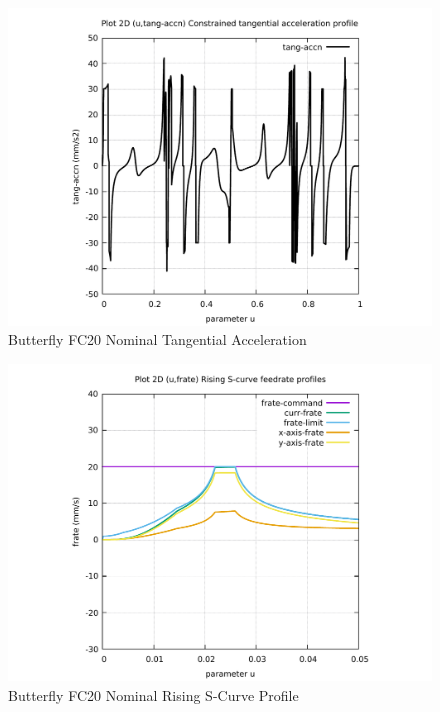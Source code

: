 \begin{figure}
	\caption     {Butterfly FC20 Nominal Tangential Acceleration}
	\label{14-img-Butterfly-FC20-Nominal-Tangential-Acceleration.pdf}
	\includegraphics[width=1.00\textwidth]{Chap4/appendix/app-Butterfly/plots/14-img-Butterfly-FC20-Nominal-Tangential-Acceleration.pdf}
\end{figure}

\clearpage
\pagebreak

\begin{figure}
	\caption     {Butterfly FC20 Nominal Rising S-Curve Profile}
	\label{15-img-Butterfly-FC20-Nominal-Rising-S-Curve-Profile.pdf}
\includegraphics[width=1.00\textwidth]{Chap4/appendix/app-Butterfly/plots/15-img-Butterfly-FC20-Nominal-Rising-S-Curve-Profile.pdf}
\end{figure}



